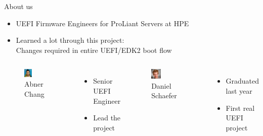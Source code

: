 \documentclass[
  10pt
]{beamer}
\begin{document}
\begin{frame}{About us}
  \begin{itemize}
    \item UEFI Firmware Engineers for ProLiant Servers at HPE
    \item Learned a lot through this project:\\
          Changes required in entire UEFI/EDK2 boot flow
  \end{itemize}

  \vfill

  \begin{columns}
    \begin{figure}[h]
      \includegraphics[width=0.3\textwidth]{resources/abner.jpg}
      \caption{Abner Chang}
    \end{figure}
    \begin{itemize}
      \item Senior UEFI Engineer
      \item Lead the project 
    \end{itemize}

    \begin{figure}[h]
      \includegraphics[width=0.3\textwidth]{resources/daniel.jpg}
      \caption{Daniel Schaefer}
    \end{figure}

    \begin{itemize}
      \item Graduated last year
      \item First real UEFI project
    \end{itemize}
  \end{columns}
\end{frame}
\end{document}
